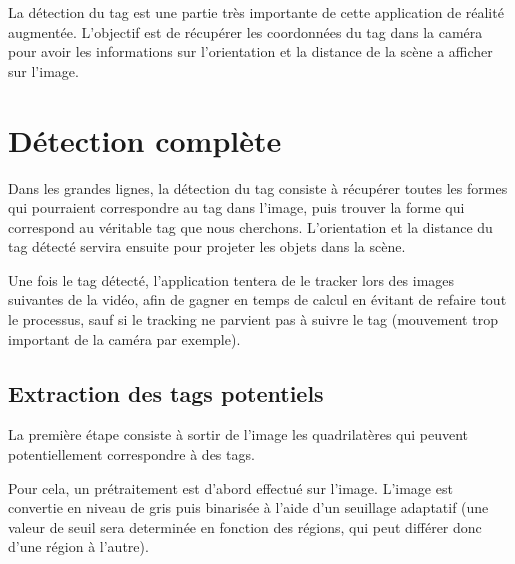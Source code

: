 \newpage
{}

La détection du tag est une partie très importante de cette application de réalité augmentée. L'objectif est de récupérer les coordonnées du tag dans la caméra pour avoir les informations sur l'orientation et la distance de la scène a afficher sur l'image.

    \section{Détection complète}

    Dans les grandes lignes, la détection du tag consiste à récupérer toutes les formes qui pourraient correspondre au tag dans l'image, puis trouver la forme qui correspond au véritable tag que nous cherchons. L'orientation et la distance du tag détecté servira ensuite pour projeter les objets dans la scène.

    Une fois le tag détecté, l'application tentera de le tracker lors des images suivantes de la vidéo, afin de gagner en temps de calcul en évitant de refaire tout le processus, sauf si le tracking ne parvient pas à suivre le tag (mouvement trop important de la caméra par exemple).

        \subsection{Extraction des tags potentiels}

        La première étape consiste à sortir de l'image les quadrilatères qui peuvent potentiellement correspondre à des tags.

        Pour cela, un prétraitement est d'abord effectué sur l'image. L'image est convertie en niveau de gris puis binarisée à l'aide d'un seuillage adaptatif (une valeur de seuil sera determinée en fonction des régions, qui peut différer donc d'une région à l'autre).

